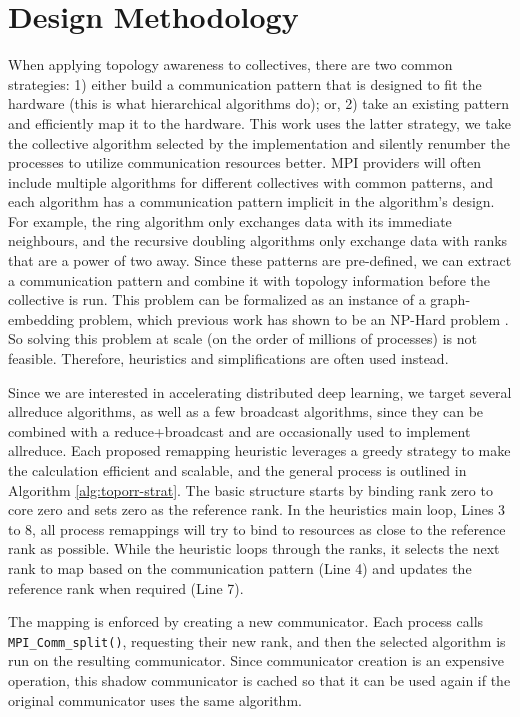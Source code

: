 \section{Design Methodology}
When applying topology awareness to collectives, there are two common strategies: 1) either build a communication pattern that is designed to fit the hardware (this is what hierarchical algorithms do); or, 2) take an existing pattern and efficiently map it to the hardware.
This work uses the latter strategy, we take the collective algorithm selected by the implementation and silently renumber the processes to utilize communication resources better.
\gls{MPI} providers will often include multiple algorithms for different collectives with common patterns, and each algorithm has a communication pattern implicit in the algorithm's design.
For example, the ring algorithm only exchanges data with its immediate neighbours, and the recursive doubling algorithms only exchange data with ranks that are a power of two away.
Since these patterns are pre-defined, we can extract a communication pattern and combine it with topology information before the collective is run.
This problem can be formalized as an instance of a graph-embedding problem, which previous work has shown to be an NP-Hard problem \cite{Hoefler2011GenericTopoMappingStrats}. 
So solving this problem at scale (on the order of millions of processes) is not feasible. 
Therefore, heuristics and simplifications are often used instead.

Since we are interested in accelerating distributed deep learning, we target several allreduce algorithms, as well as a few broadcast algorithms, since they can be combined with a reduce+broadcast and are occasionally used to implement allreduce.
Each proposed remapping heuristic leverages a greedy strategy to make the calculation efficient and scalable, and the general process is outlined in Algorithm \ref{alg:toporr-strat}.
The basic structure starts by binding rank zero to core zero and sets zero as the reference rank.
In the heuristics main loop, Lines 3 to 8, all process remappings will try to bind to resources as close to the reference rank as possible.
While the heuristic loops through the ranks, it selects the next rank to map based on the communication pattern (Line 4) and updates the reference rank when required (Line 7).



The mapping is enforced by creating a new communicator.
Each process calls \texttt{MPI\_Comm\_split()}, requesting their new rank, and then the selected algorithm is run on the resulting communicator.
Since communicator creation is an expensive operation, this shadow communicator is cached so that it can be used again if the original communicator uses the same algorithm.

